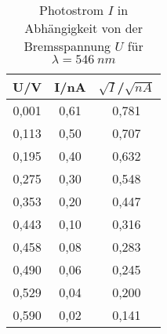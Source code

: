 \begin{table}[h!]
  \centering
  \caption{Photostrom $I$ in Abhängigkeit von der Bremsspannung $U$ für $\lambda=\SI{546}{nm}$}
  \label{tab:g546}
  \begin{tabular}{c c c}
    \toprule
      U/V & I/nA  & $\sqrt{I}$/$\sqrt{nA}$  \\
    \midrule
      0,001 & 0,61 & 0,781 \\
      0,113 & 0,50 & 0,707 \\
      0,195 & 0,40 & 0,632 \\
      0,275 & 0,30 & 0,548 \\
      0,353 & 0,20 & 0,447 \\
      0,443 & 0,10 & 0,316 \\
      0,458 & 0,08 & 0,283 \\
      0,490 & 0,06 & 0,245 \\
      0,529 & 0,04 & 0,200 \\
      0,590 & 0,02 & 0,141 \\


    \bottomrule
  \end{tabular}
\end{table}

